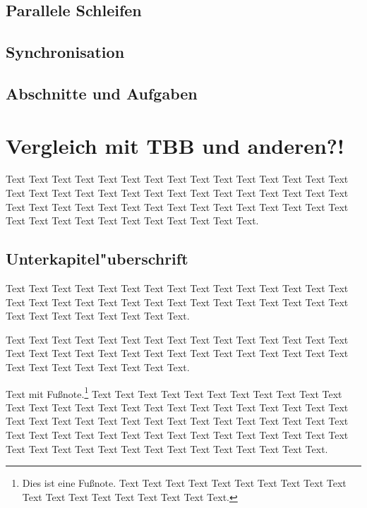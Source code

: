 \documentclass[11pt]{scrartcl}
\begin{document}
\subsection{Parallele Schleifen} \subsection{Synchronisation} \subsection{Abschnitte und
Aufgaben}

\pagebreak %

\section{Vergleich mit TBB und anderen?!}

Text Text Text Text Text Text Text Text Text Text Text Text Text Text Text Text Text Text
Text Text Text Text Text Text Text Text Text Text Text Text Text Text Text Text Text Text
Text Text Text Text Text Text Text Text Text Text Text Text Text Text Text Text Text Text
Text Text.

\subsection{Unterkapitel"uberschrift}

Text Text Text Text Text Text Text Text Text Text Text Text Text Text Text Text Text Text
Text Text Text Text Text Text Text Text Text Text Text Text Text Text Text Text Text Text
Text Text.


Text Text Text Text Text Text Text Text Text Text Text Text Text Text Text Text Text Text
Text Text Text Text Text Text Text Text Text Text Text Text Text Text Text Text Text Text
Text Text.

Text mit Fußnote.\footnote{Dies ist eine Fußnote. Text Text Text Text Text Text Text Text
Text Text Text Text Text Text Text Text Text Text Text.} Text \cite{Ez99,ABC01} Text Text
Text Text Text Text Text Text Text Text Text Text Text Text Text Text Text Text Text Text
Text Text Text Text Text Text Text Text  Text Text Text Text Text Text Text Text Text Text
Text Text Text Text Text Text Text Text Text Text Text Text Text Text Text Text Text Text
Text Text Text Text Text Text Text Text Text Text Text Text Text.
\end{document}
